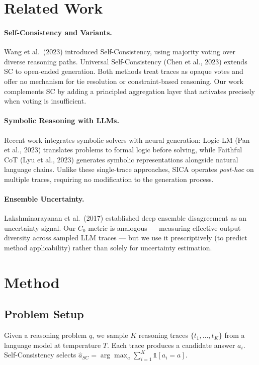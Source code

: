 \documentclass[11pt]{article}
\begin{document}
\section{Related Work}

\paragraph{Self-Consistency and Variants.} Wang et al.\ (2023) introduced Self-Consistency, using majority voting over diverse reasoning paths. Universal Self-Consistency (Chen et al., 2023) extends SC to open-ended generation. Both methods treat traces as opaque votes and offer no mechanism for tie resolution or constraint-based reasoning. Our work complements SC by adding a principled aggregation layer that activates precisely when voting is insufficient.

\paragraph{Symbolic Reasoning with LLMs.} Recent work integrates symbolic solvers with neural generation: Logic-LM (Pan et al., 2023) translates problems to formal logic before solving, while Faithful CoT (Lyu et al., 2023) generates symbolic representations alongside natural language chains. Unlike these single-trace approaches, SICA operates \emph{post-hoc} on multiple traces, requiring no modification to the generation process.

\paragraph{Ensemble Uncertainty.} Lakshminarayanan et al.\ (2017) established deep ensemble disagreement as an uncertainty signal. Our $C_0$ metric is analogous --- measuring effective output diversity across sampled LLM traces --- but we use it prescriptively (to predict method applicability) rather than solely for uncertainty estimation.

\section{Method}

\subsection{Problem Setup}

Given a reasoning problem $q$, we sample $K$ reasoning traces $\{t_1, \ldots, t_K\}$ from a language model at temperature $T$. Each trace produces a candidate answer $a_i$. Self-Consistency selects $\hat{a}_{SC} = \arg\max_a \sum_{i=1}^K \mathbb{1}[a_i = a]$.
\end{document}
